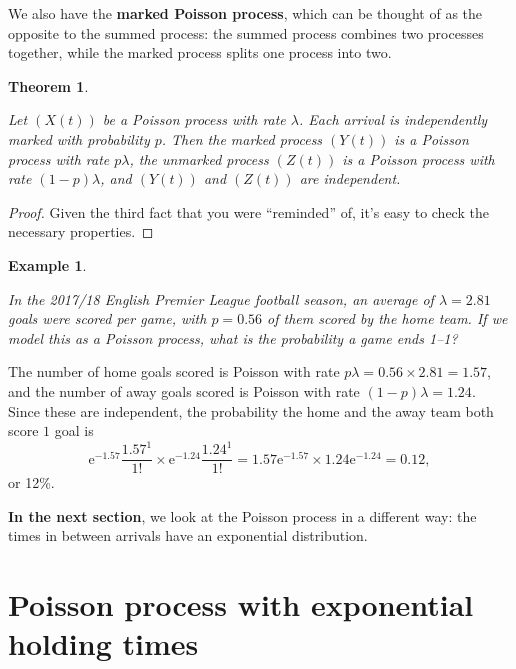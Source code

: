 \documentclass[
  a4paper,
]{article}
\newtheorem{theorem}{Theorem}[section]
\theoremstyle{definition}
\theoremstyle{definition}
\newtheorem{example}{Example}[section]
\theoremstyle{definition}
\theoremstyle{remark}
\begin{document}
We also have the \textbf{marked Poisson process}, which can be thought of as the opposite to the summed process: the summed process combines two processes together, while the marked process splits one process into two.

\begin{theorem}
\protect\hypertarget{thm:marked}{}\label{thm:marked}

Let \((X(t))\) be a Poisson process with rate \(\lambda\). Each arrival is independently marked with probability \(p\). Then the marked process \((Y(t))\) is a Poisson process with rate \(p\lambda\), the unmarked process \((Z(t))\) is a Poisson process with rate \((1-p)\lambda\), and \((Y(t))\) and \((Z(t))\) are independent.

\end{theorem}

\begin{proof}

Given the third fact that you were ``reminded'' of, it's easy to check the necessary properties.

\end{proof}

\begin{example}
\protect\hypertarget{exm:pois-ex-4}{}\label{exm:pois-ex-4}

\emph{In the 2017/18 English Premier League football season, an average of \(\lambda = 2.81\) goals were scored per game, with \(p = 0.56\) of them scored by the home team. If we model this as a Poisson process, what is the probability a game ends 1--1?}

The number of home goals scored is Poisson with rate \(p\lambda = 0.56\times 2.81 = 1.57\), and the number of away goals scored is Poisson with rate \((1-p)\lambda = 1.24\). Since these are independent, the probability the home and the away team both score \(1\) goal is
\[ \mathrm{e}^{-1.57} \frac{1.57^1}{1!} \times  \mathrm{e}^{-1.24} \frac{1.24^1}{1!} = 1.57\mathrm{e}^{-1.57} \times 1.24 \mathrm{e}^{-1.24} =  0.12, \]
or 12\%.

\end{example}

\textbf{In the next section}, we look at the Poisson process in a different way: the times in between arrivals have an exponential distribution.

\hypertarget{S13-poisson-exponential}{%
\section{Poisson process with exponential holding times}\label{S13-poisson-exponential}}
\end{document}
